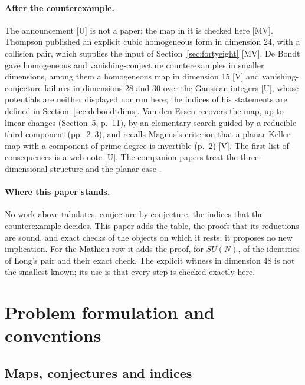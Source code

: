 \documentclass[11pt]{article}
\theoremstyle{remark}
\begin{document}
\paragraph{After the counterexample.} The announcement \cite{Alpoge2026} [U] is not a paper; the map in it is checked here [MV]. Thompson published an explicit cubic homogeneous form in dimension 24, with a collision pair, which supplies the input of Section~\ref{sec:fortyeight} \cite{Thompson2026} [MV]. De Bondt gave homogeneous and vanishing-conjecture counterexamples in smaller dimensions, among them a homogeneous map in dimension 15 \cite[abstract, p.~1; Introduction, p.~2]{deBondt2026} [V] and vanishing-conjecture failures in dimensions 28 and 30 over the Gaussian integers \cite[abstract, p.~1; Introduction, p.~4]{deBondt2026} [U], whose potentials are neither displayed nor run here; the indices of his statements are defined in Section~\ref{sec:debondtdims}. Van den Essen recovers the map, up to linear changes (Section~5, p.~11), by an elementary search guided by a reducible third component (pp.~2--3), and recalls Magnus's criterion that a planar Keller map with a component of prime degree is invertible (p.~2) \cite{vdE2026} [V]. The first list of consequences is a web note \cite{Zhang2026} [U]. The companion papers treat the three-dimensional structure and the planar case \cite{FoundationalPaper, PlanarPaper}.

\paragraph{Where this paper stands.} No work above tabulates, conjecture by conjecture, the indices that the counterexample decides. This paper adds the table, the proofs that its reductions are sound, and exact checks of the objects on which it rests; it proposes no new implication. For the Mathieu row it adds the proof, for $SU(N)$, of the identities of Long's pair and their exact check. The explicit witness in dimension 48 is not the smallest known; its use is that every step is checked exactly here.

\section{Problem formulation and conventions}\label{sec:problem}

\subsection{Maps, conjectures and indices}\label{sec:defs}
\end{document}
